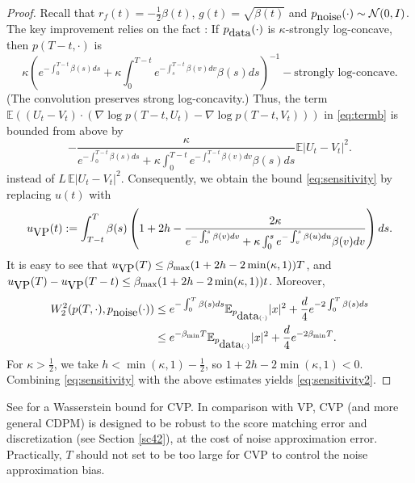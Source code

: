 \documentclass[letterpaper,11pt,reqno]{amsart}
\numberwithin{equation}{section}
\begin{document}
\begin{proof}
Recall that $r_f(t) = -\frac{1}{2} \beta (t)$, $g(t) = \sqrt{\beta(t)}$ and 
$p_{\tiny \mbox{noise}}(\cdot) \sim \mathcal{N}(0,I)$.
The key improvement relies on the fact \cite[Proposition 10]{GNZ23}:
If $p_{\tiny \mbox{data}}(\cdot)$ is $\kappa$-strongly log-concave,
then $p(T-t, \cdot)$ is 
$$\kappa \left(e^{-\int_0^{T-t} \beta(s) ds}+ \kappa \int_0^{T-t}e^{- \int_s^{T-t} \beta(v) dv} \beta(s) ds\right)^{-1}-\mbox{strongly log-concave}.$$
(The convolution preserves strong log-concavity.)
Thus, the term $\mathbb{E}((U_t - V_t) \cdot (\nabla \log p(T-t, U_t) - \nabla \log p(T-t, V_t)  ))$ in \eqref{eq:termb}
is bounded from above by
\begin{equation*}
- \frac{\kappa}{e^{-\int_0^{T-t} \beta(s) ds}+ \kappa \int_0^{T-t}e^{- \int_s^{T-t} \beta(v) dv} \beta(s) ds} \mathbb{E}|U_t - V_t|^2.
\end{equation*}
instead of $L \, \mathbb{E}|U_t - V_t|^2$.
Consequently, we obtain the bound \eqref{eq:sensitivity} by replacing $u(t)$ with
\begin{equation}
\label{eq:uVP}
u_{\tiny \mbox{VP}}(t): = \int_{T-t}^T \beta(s) \left(1 + 2h - \frac{2 \kappa}{e^{-\int_0^{s} \beta(v) dv}+ \kappa \int_0^{s}e^{- \int_v^{s} \beta(u) du} \beta(v) dv}\right) ds.
\end{equation}
It is easy to see that
$u_{\tiny \mbox{VP}}(T) \le \beta_{\max} (1 + 2h - 2 \min(\kappa, 1)) T$,
and 
$u_{\tiny \mbox{VP}}(T) - u_{\tiny \mbox{VP}}(T-t) \le \beta_{\max} (1 + 2h - 2 \min(\kappa, 1)) t$.
Moreover, 
\begin{equation*}
\begin{aligned}
W_2^2(p(T, \cdot), p_{\tiny \mbox{noise}}(\cdot)) 
& \le e^{-\int_0^T \beta(s) ds} \mathbb{E}_{p_{\tiny \mbox{data}(\cdot)}}|x|^2 + \frac{d}{4}e^{-2 \int_0^T \beta(s) ds} \\
& \le e^{- \beta_{\min} T} \mathbb{E}_{p_{\tiny \mbox{data}(\cdot)}}|x|^2 + \frac{d}{4} e^{-2 \beta_{\min} T}.
\end{aligned}
\end{equation*}
For $\kappa > \frac{1}{2}$,
we take $h < \min(\kappa, 1) - \frac{1}{2}$, so 
$1+ 2h - 2 \min(\kappa, 1) < 0$.
Combining \eqref{eq:sensitivity}
with the above estimates yields \eqref{eq:sensitivity2}.
\end{proof}

\quad See \cite{TZ24} for a Wasserstein bound for CVP. 
In comparison with VP, CVP (and more general CDPM) is designed to be robust to 
the score matching error and discretization (see Section \ref{sc42}),
at the cost of noise approximation error.
Practically, $T$ should not set to be too large for CVP
to control the noise approximation bias.
\end{document}

